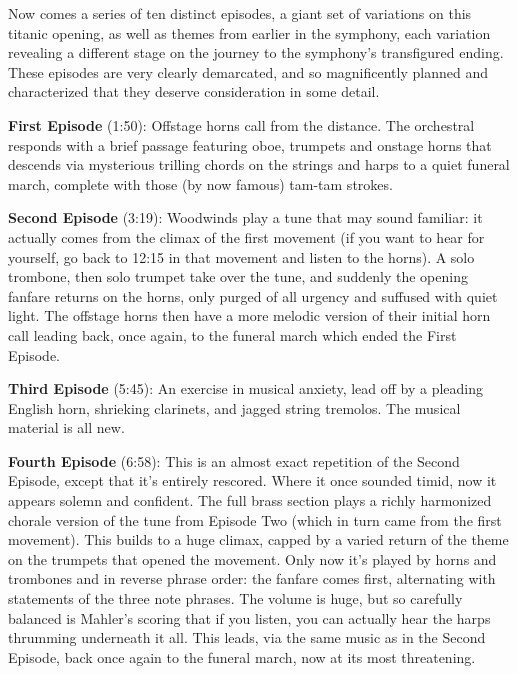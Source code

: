 \documentclass[12pt]{article}%
\begin{document}
Now comes a series of ten distinct episodes, a giant set of variations on this titanic opening, as well as themes from earlier in the symphony, each variation revealing a different stage on the journey to the symphony's transfigured ending.
These episodes are very clearly demarcated, and so magnificently planned and characterized that they deserve consideration in some detail.

{\bf First Episode} (1:50): Offstage horns call from the distance. The orchestral responds with a brief passage featuring oboe, trumpets and onstage horns that descends via mysterious trilling chords on the strings and harps to a quiet funeral march, complete with those (by now famous) tam-tam strokes.

{\bf Second Episode} (3:19): Woodwinds play a tune that may sound familiar: it actually comes from the climax of the first movement (if you want to hear for yourself, go back to 12:15 in that movement and listen to the horns). A solo trombone, then solo trumpet take over the tune, and suddenly the opening fanfare returns on the horns, only purged of all urgency and suffused with quiet light. The offstage horns then have a more melodic version of their initial horn call leading back, once again, to the funeral march which ended the First Episode.

{\bf Third Episode} (5:45): An exercise in musical anxiety, lead off by a pleading English horn, shrieking clarinets, and jagged string tremolos.
The musical material is all new.

{\bf Fourth Episode} (6:58): This is an almost exact repetition of the Second Episode, except that it's entirely rescored. Where it once sounded timid, now it appears solemn and confident.
The full brass section plays a richly harmonized chorale version of the tune from Episode Two (which in turn came from the first movement).
This builds to a huge climax, capped by a varied return of the theme on the trumpets that opened the movement. Only now it's played by horns and trombones and in reverse phrase order: the fanfare comes first, alternating with statements of the three note phrases. The volume is huge, but so carefully balanced is Mahler's scoring that if you listen, you can actually hear the harps thrumming underneath it all. This leads, via the same music as in the Second Episode, back once again to the funeral march, now at its most threatening.
\end{document}
